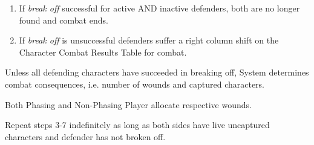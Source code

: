 \documentclass[twoside,letterpaper]{article}
\begin{document}
\begin{usecase}
{\begin{enumerate}
\begin{enumerate}
				\item If \textit{break off} successful for active AND inactive defenders, both are no longer found and combat ends.
				\item If \textit{break off} is unsuccessful defenders suffer a right column shift on the Character Combat Results Table for combat.
				\end{enumerate}
			\end{enumerate}
		\item Unless all defending characters have succeeded in breaking off, System determines combat consequences, i.e. number of wounds and captured characters.
		\item Both Phasing and Non-Phasing Player allocate respective wounds.
		\item Repeat steps 3-7 indefinitely as long as both sides have live uncaptured characters and defender has not broken off.
	}
	\finalize
\end{usecase}

\clearpage
\end{document}
